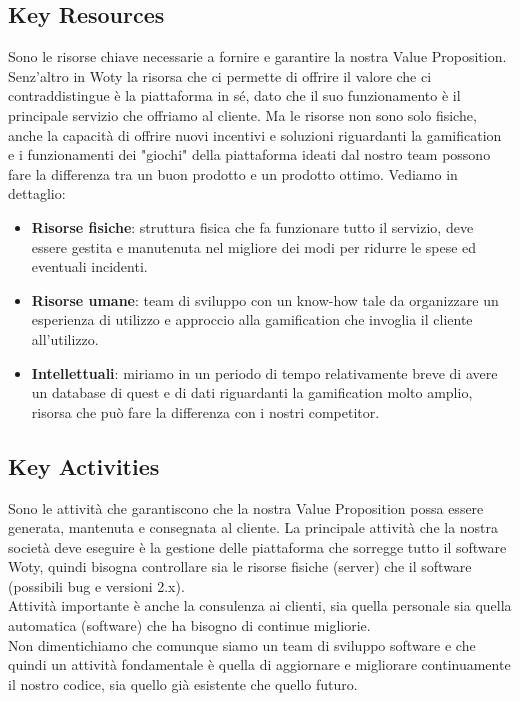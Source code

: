 \subsection{Key Resources}
Sono le risorse chiave necessarie a fornire e garantire la nostra Value Proposition. Senz'altro in Woty la risorsa che ci permette di offrire il valore che ci contraddistingue è la piattaforma in sé, dato che il suo funzionamento è il principale servizio che offriamo al cliente. Ma le risorse non sono solo fisiche, anche la capacità di offrire nuovi incentivi e soluzioni riguardanti la gamification e i funzionamenti dei "giochi" della piattaforma ideati dal nostro team possono fare la differenza tra un buon prodotto e un prodotto ottimo. Vediamo in dettaglio:
\begin{itemize}
\item \textbf{Risorse fisiche}: struttura fisica che fa funzionare tutto il servizio, deve essere gestita e manutenuta nel migliore dei modi per ridurre le spese ed eventuali incidenti.
\item \textbf{Risorse umane}: team di sviluppo con un know-how tale da organizzare un esperienza di utilizzo e approccio alla gamification che invoglia il cliente all'utilizzo.
\item \textbf{Intellettuali}: miriamo in un periodo di tempo relativamente breve di avere un database di quest e di dati riguardanti la gamification molto amplio, risorsa che può fare la differenza con i nostri competitor.
\end{itemize}

\subsection{Key Activities}
Sono le attività che garantiscono che la nostra Value Proposition possa essere generata, mantenuta e consegnata al cliente. La principale attività che la nostra società deve eseguire è la gestione delle piattaforma che sorregge tutto il software Woty, quindi bisogna controllare sia le risorse fisiche (server) che il software (possibili bug e versioni 2.x).\\
Attività importante è anche la consulenza ai clienti, sia quella personale sia quella automatica (software) che ha bisogno di continue migliorie.\\
Non dimentichiamo che comunque siamo un team di sviluppo software e che quindi un attività fondamentale è quella di aggiornare e migliorare continuamente il nostro codice, sia quello già esistente che quello futuro.

